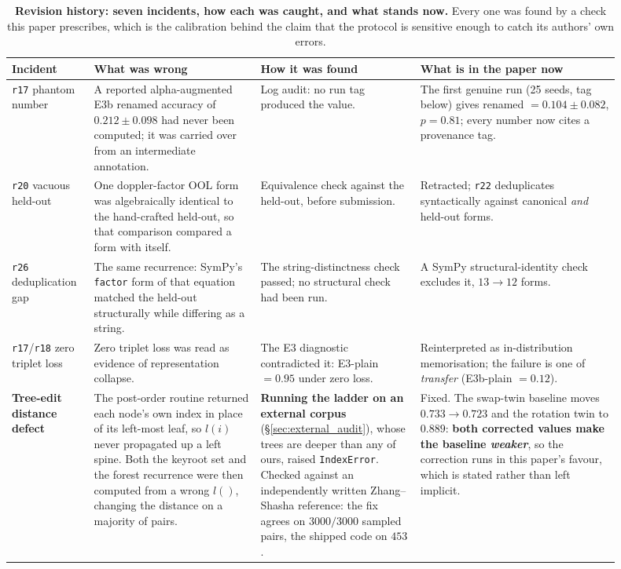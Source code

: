\begin{table}[h]
\centering
\footnotesize
\caption{\textbf{Revision history: seven incidents, how each was caught, and what stands now.} Every one was found by a check this paper prescribes, which is the calibration behind the claim that the protocol is sensitive enough to catch its authors' own errors.}
\label{tab:revision_incidents}
\setlength{\tabcolsep}{4pt}
\renewcommand{\arraystretch}{1.15}
\begin{tabular}{@{}>{\raggedright\arraybackslash}p{0.11\linewidth} >{\raggedright\arraybackslash}p{0.25\linewidth} >{\raggedright\arraybackslash}p{0.24\linewidth} >{\raggedright\arraybackslash}p{0.30\linewidth}@{}}
\toprule
Incident & What was wrong & How it was found & What is in the paper now \\
\midrule
\texttt{r17} phantom number & A reported alpha-augmented E3b renamed accuracy of $0.212 \pm 0.098$ had never been computed; it was carried over from an intermediate annotation. & Log audit: no run tag produced the value. & The first genuine run (25 seeds, tag below) gives renamed $= 0.104 \pm 0.082$, $p{=}0.81$; every number now cites a provenance tag. \\
\texttt{r20} vacuous held-out & One doppler-factor OOL form was algebraically identical to the hand-crafted held-out, so that comparison compared a form with itself. & Equivalence check against the held-out, before submission. & Retracted; \texttt{r22} deduplicates syntactically against canonical \emph{and} held-out forms. \\
\texttt{r26} deduplication gap & The same recurrence: SymPy's \texttt{factor} form of that equation matched the held-out structurally while differing as a string. & The string-distinctness check passed; no structural check had been run. & A SymPy structural-identity check excludes it, $13 \to 12$ forms. \\
\texttt{r17}/\texttt{r18} zero triplet loss & Zero triplet loss was read as evidence of representation collapse. & The E3 diagnostic contradicted it: E3-plain $= 0.95$ under zero loss. & Reinterpreted as in-distribution memorisation; the failure is one of \emph{transfer} (E3b-plain $= 0.12$). \\
\textbf{Tree-edit distance defect} & The post-order routine returned each node's own index in place of its left-most leaf, so $l(i)$ never propagated up a left spine. Both the keyroot set and the forest recurrence were then computed from a wrong $l()$, changing the distance on a majority of pairs. & \textbf{Running the ladder on an external corpus} (\S\ref{sec:external_audit}), whose trees are deeper than any of ours, raised \texttt{IndexError}. Checked against an independently written Zhang--Shasha reference: the fix agrees on $3000/3000$ sampled pairs, the shipped code on $453$. & Fixed. The swap-twin baseline moves $0.733 \to 0.723$ and the rotation twin to $0.889$: \textbf{both corrected values make the baseline \emph{weaker}}, so the correction runs in this paper's favour, which is stated rather than left implicit. \\

\end{tabular}
\end{table}
